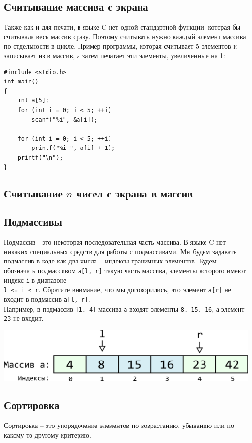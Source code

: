 \documentclass{article}
\begin{document}
\subsection*{Считывание массива с экрана}
Также как и для печати, в языке C нет одной стандартной функции, которая бы считывала весь массив сразу.
Поэтому считывать нужно каждый элемент массива по отдельности в цикле. Пример программы, которая считывает 5 элементов и записывает из в массив, а затем печатает эти элементы, увеличенные на 1:
\begin{lstlisting}
#include <stdio.h>
int main()
{
    int a[5];
    for (int i = 0; i < 5; ++i)
        scanf("%i", &a[i]);

    for (int i = 0; i < 5; ++i)
        printf("%i ", a[i] + 1);
    printf("\n");
}
\end{lstlisting}


\subsection*{Считывание $n$ чисел с экрана в массив}


\newpage
\subsection*{Подмассивы}
Подмассив - это некоторая последовательная часть массива. В языке C нет никаких специальных средств для работы с подмассивами. Мы будем задавать подмассив в коде как два числа -- индексы граничных элементов. Будем обозначать подмассивом \texttt{a[l, r]} такую часть массива, элементы которого имеют индекс \texttt{i} в диапазоне \\
\texttt{l <= i < r}. Обратите внимание, что мы договорились, что элемент \texttt{a[r]} не входит в подмассив \texttt{a[l, r]}.\\

Например, в подмассив \texttt{[1, 4]} массива \texttt{a} входят элементы \texttt{8, 15, 16}, а элемент \texttt{23} не входит.
\begin{center}
\includegraphics[scale=0.8]{../images/array_slice.png}
\end{center}


\subsection*{Сортировка}
Сортировка -- это упорядочение элементов по возрастанию, убыванию или по какому-то другому критерию.
\end{document}
